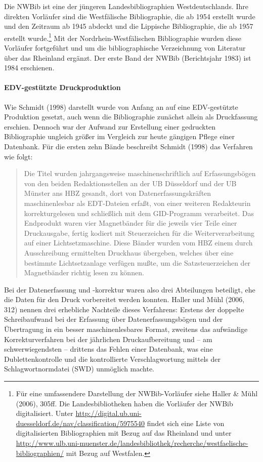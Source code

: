 \documentclass[a4paper,
fontsize=11pt,
oneside,
numbers=noperiodatend,
parskip=half-,
bibliography=totoc,
final
]{scrartcl}
\begin{document}
Die NWBib ist eine der jüngeren Landesbibliographien Westdeutschlands.
Ihre direkten Vorläufer sind die Westfälische Bibliographie, die ab 1954
erstellt wurde und den Zeitraum ab 1945 abdeckt und die Lippische
Bibliographie, die ab 1957 erstellt wurde.\footnote{Für eine
  umfassendere Darstellung der NWBib-Vorläufer siehe Haller \& Mühl
  (2006), 305ff. Die Landesbibliotheken haben die Vorläufer der NWBib
  digitalisiert. Unter
  \url{http://digital.ub.uni-duesseldorf.de/nav/classification/5975540}
  findet sich eine Liste von digitalisierten Bibliographien mit Bezug
  auf das Rheinland und unter
  \url{http://www.ulb.uni-muenster.de/landesbibliothek/recherche/westfaelische-bibliographien/}
  mit Bezug auf West\-falen.} Mit der Nordrhein-Westfälischen
Bibliographie wurden diese Vorläufer fortgeführt und um die
bibliographische Verzeichnung von Literatur über das Rheinland ergänzt.
Der erste Band der NWBib (Berichtsjahr 1983) ist 1984 erschienen.

\paragraph{EDV-gestützte
Druckproduktion}\label{edv-gestuxfctzte-druckproduktion}

Wie Schmidt (1998) darstellt wurde von Anfang an auf eine EDV-gestützte
Produktion gesetzt, auch wenn die Bibliographie zunächst allein als
Druckfassung erschien. Dennoch war der Aufwand zur Erstellung einer
gedruckten Bibliographie ungleich größer im Vergleich zur heute gängigen
Pflege einer Datenbank. Für die ersten zehn Bände beschreibt Schmidt
(1998) das Verfahren wie folgt:

\begin{quote}
Die Titel wurden jahrgangsweise maschinenschriftlich auf Erfassungsbögen
von den beiden Redaktionsstellen an der UB Düsseldorf und der UB Münster
ans HBZ gesandt, dort von Datenerfassungskräften maschinenlesbar als
EDT-Dateien erfaßt, von einer weiteren Redakteurin korrekturgelesen und
schließlich mit dem GID-Programm verarbeitet. Das Endprodukt waren vier
Magnetbänder für die jeweils vier Teile einer Druckausgabe, fertig
kodiert mit Steuerzeichen für die Weiterverarbeitung auf einer
Lichtsetzmaschine. Diese Bänder wurden vom HBZ einem durch Ausschreibung
ermittelten Druckhaus übergeben, welches über eine bestimmte
Lichtsetzanlage verfügen mußte, um die Satzsteuerzeichen der
Magnetbänder richtig lesen zu können.
\end{quote}

Bei der Datenerfassung und -korrektur waren also drei Abteilungen
beteiligt, ehe die Daten für den Druck vorbereitet werden konnten.
Haller und Mühl (2006, 312) nennen drei erhebliche Nachteile dieses
Verfahrens: Erstens der doppelte Schreibaufwand bei der Erfassung über
Datenerfassungsbögen und der Übertragung in ein besser maschinenlesbares
Format, zweitens das aufwändige Korrekturverfahren bei der jährlichen
Druckaufbereitung und -- am schwerwiegendsten -- drittens das Fehlen
einer Datenbank, was eine Dublettenkontrolle und die kontrollierte
Verschlagwortung mittels der Schlagwortnormdatei (SWD) unmöglich machte.
\end{document}
